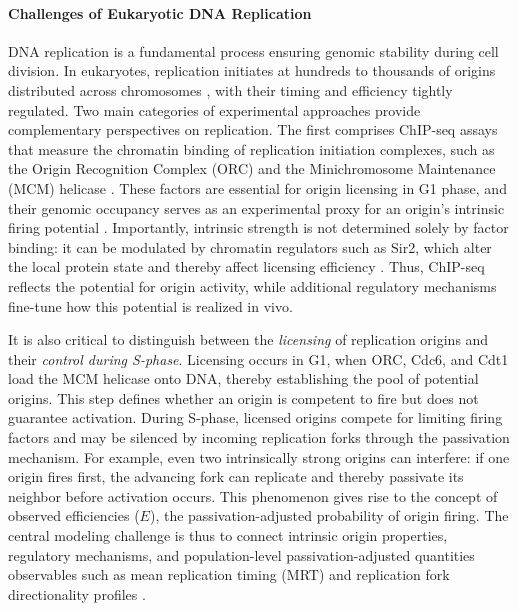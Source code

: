 \documentclass[10pt,a4paper]{revtex4-2}
\begin{document}
\paragraph*{Challenges of Eukaryotic DNA Replication}
DNA replication is a fundamental process ensuring genomic stability during cell division. 
In eukaryotes, replication initiates at hundreds to thousands of origins distributed across chromosomes \cite{DePamphilis2010},
with their timing and efficiency tightly regulated. 
Two main categories of experimental approaches provide complementary perspectives on replication.
The first comprises ChIP-seq assays that measure the chromatin binding of replication initiation complexes, 
such as the Origin Recognition Complex (ORC) and the Minichromosome Maintenance (MCM) helicase \cite{Dellino2013,Kirstein2021,Miotto2016,Foss2021,Li2023}. 
These factors are essential for origin licensing in G1 phase, and their genomic occupancy serves as an 
experimental proxy for an origin’s intrinsic firing potential \cite{Dellino2013}. 
Importantly, intrinsic strength is not determined solely by factor binding: it can be modulated by chromatin regulators such as Sir2, 
which alter the local protein state and thereby affect licensing efficiency \cite{Hayashi2009,Hoggard2020}. 
Thus, ChIP-seq reflects the potential for origin activity, while additional regulatory mechanisms fine-tune how this potential is realized in vivo.

It is also critical to distinguish between the \textit{licensing} of replication origins and their \textit{control during S-phase}. 
Licensing occurs in G1, when ORC, Cdc6, and Cdt1 load the MCM helicase onto DNA, thereby establishing the pool of potential origins. 
This step defines whether an origin is competent to fire but does not guarantee activation. 
During S-phase, licensed origins compete for limiting firing factors and may be silenced by incoming replication forks through the passivation mechanism. 
For example, even two intrinsically strong origins can interfere: if one origin fires first, the advancing fork can replicate and thereby passivate its neighbor before activation occurs. 
This phenomenon gives rise to the concept of observed efficiencies (\(E\)), 
the passivation-adjusted probability of origin firing. 
The central modeling challenge is thus to connect intrinsic origin properties, regulatory mechanisms, 
and population-level passivation-adjusted quantities observables such as mean replication timing (MRT) \cite{Long2020,Hansen2010,Zhao2020} and 
replication fork directionality profiles \cite{Petryk2016,Wu2018}.
\end{document}
